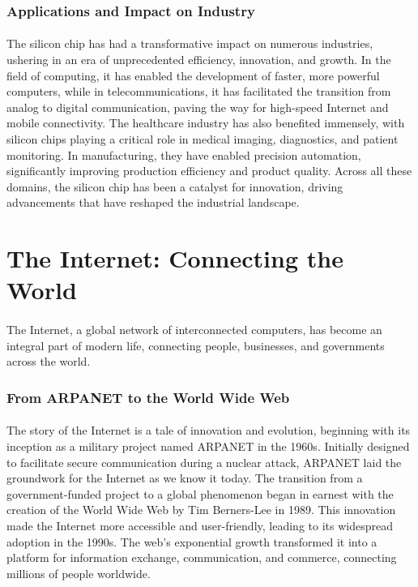 \documentclass[a4paper,12pt]{book}
\begin{document}
\subsubsection*{Applications and Impact on Industry}
\paragraph{}
The silicon chip has had a transformative impact on numerous industries, ushering in an era of unprecedented efficiency, innovation, and growth. In the field of computing, it has enabled the development of faster, more powerful computers, while in telecommunications, it has facilitated the transition from analog to digital communication, paving the way for high-speed Internet and mobile connectivity. The healthcare industry has also benefited immensely, with silicon chips playing a critical role in medical imaging, diagnostics, and patient monitoring. In manufacturing, they have enabled precision automation, significantly improving production efficiency and product quality. Across all these domains, the silicon chip has been a catalyst for innovation, driving advancements that have reshaped the industrial landscape.

\section*{The Internet: Connecting the World}
\paragraph{}
The Internet, a global network of interconnected computers, has become an integral part of modern life, connecting people, businesses, and governments across the world.

\subsubsection*{From ARPANET to the World Wide Web}
\paragraph{}
The story of the Internet is a tale of innovation and evolution, beginning with its inception as a military project named ARPANET in the 1960s. Initially designed to facilitate secure communication during a nuclear attack, ARPANET laid the groundwork for the Internet as we know it today. The transition from a government-funded project to a global phenomenon began in earnest with the creation of the World Wide Web by Tim Berners-Lee in 1989. This innovation made the Internet more accessible and user-friendly, leading to its widespread adoption in the 1990s. The web's exponential growth transformed it into a platform for information exchange, communication, and commerce, connecting millions of people worldwide.
\end{document}
